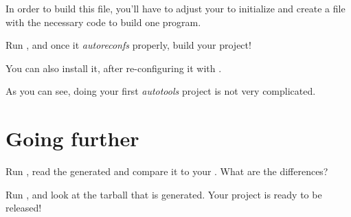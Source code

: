 In order to build this file, you'll have to adjust your
 to initialize  and create a
 file with the necessary code to build one program.

Run , and once it {\em autoreconfs} properly,
build your project!

You can also install it, after re-configuring it with
.

As you can see, doing your first {\em autotools} project is not very
complicated.

\section{Going further}

Run , read the generated  and
compare it to your . What are the differences?

Run , and look at the tarball that is generated. Your
project is ready to be released!
